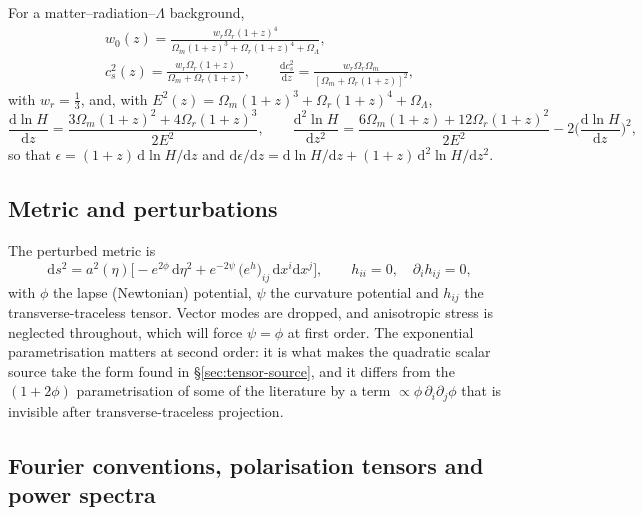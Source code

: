 \documentclass[11pt,a4paper]{article}
\newcommand{\dd}{\mathrm{d}}
\newcommand{\eps}{\epsilon}
\theoremstyle{remark}
\begin{document}
For a matter--radiation--$\Lambda$ background,
\begin{equation}
\begin{gathered}
w_0(z) = \frac{w_r\Omega_{r}(1+z)^4}{\Omega_m(1+z)^3+\Omega_r(1+z)^4+\Omega_\Lambda},\\
c_s^2(z) = \frac{w_r\Omega_r(1+z)}{\Omega_m+\Omega_r(1+z)},
\qquad
\frac{\dd c_s^2}{\dd z} = \frac{w_r\Omega_r\Omega_m}{[\Omega_m+\Omega_r(1+z)]^2},
\end{gathered}
\label{eq:w-of-z}
\end{equation}
with $w_r=\tfrac13$, and, with $E^2(z) = \Omega_m(1+z)^3+\Omega_r(1+z)^4+\Omega_\Lambda$,
\begin{equation}
\frac{\dd\ln H}{\dd z} = \frac{3\Omega_m(1+z)^2+4\Omega_r(1+z)^3}{2E^2},\qquad
\frac{\dd^2\ln H}{\dd z^2} = \frac{6\Omega_m(1+z)+12\Omega_r(1+z)^2}{2E^2} - 2\Big(\frac{\dd\ln H}{\dd z}\Big)^2,
\label{eq:dlnH}
\end{equation}
so that $\eps = (1+z)\,\dd\ln H/\dd z$ and $\dd\eps/\dd z = \dd\ln H/\dd z + (1+z)\,\dd^2\ln H/\dd z^2$.

\subsection{Metric and perturbations}
\label{sec:metric}

The perturbed metric is
\begin{equation}
\dd s^2 = a^2(\eta)\Big[-e^{2\phi}\,\dd\eta^2 + e^{-2\psi}\,\big(e^{h}\big)_{ij}\,\dd x^i\dd x^j\Big],
\qquad h_{ii} = 0,\quad \partial_ih_{ij} = 0,
\label{eq:metric}
\end{equation}
with $\phi$ the lapse (Newtonian) potential, $\psi$ the curvature potential and $h_{ij}$ the transverse-traceless tensor. Vector modes are dropped, and anisotropic stress is neglected throughout, which will force $\psi = \phi$ at first order. The exponential parametrisation matters at second order: it is what makes the quadratic scalar source take the form found in \S\ref{sec:tensor-source}, and it differs from the $(1+2\phi)$ parametrisation of some of the literature by a term $\propto \phi\,\partial_i\partial_j\phi$ that is invisible after transverse-traceless projection.

\subsection{Fourier conventions, polarisation tensors and power spectra}
\label{sec:fourier}
\end{document}
